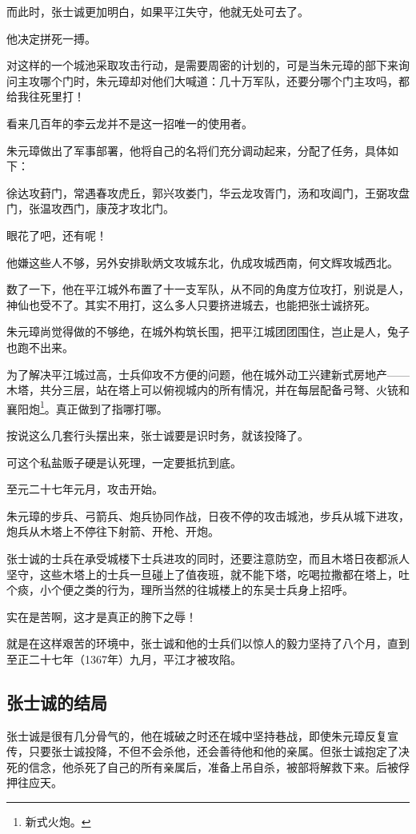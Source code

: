 \begin{multicols}{\theparacolNo}
		而此时，张士诚更加明白，如果平江失守，他就无处可去了。

		他决定拼死一搏。

		对这样的一个城池采取攻击行动，是需要周密的计划的，可是当朱元璋的部下来询问主攻哪个门时，朱元璋却对他们大喊道：几十万军队，还要分哪个门主攻吗，都给我往死里打！

		看来几百年的李云龙并不是这一招唯一的使用者。

		朱元璋做出了军事部署，他将自己的名将们充分调动起来，分配了任务，具体如下：

		徐达攻葑门，常遇春攻虎丘，郭兴攻娄门，华云龙攻胥门，汤和攻阊门，王弼攻盘门，张温攻西门，康茂才攻北门。

		眼花了吧，还有呢！

		他嫌这些人不够，另外安排耿炳文攻城东北，仇成攻城西南，何文辉攻城西北。

		数了一下，他在平江城外布置了十一支军队，从不同的角度方位攻打，别说是人，神仙也受不了。其实不用打，这么多人只要挤进城去，也能把张士诚挤死。

		朱元璋尚觉得做的不够绝，在城外构筑长围，把平江城团团围住，岂止是人，兔子也跑不出来。

		为了解决平江城过高，士兵仰攻不方便的问题，他在城外动工兴建新式房地产——木塔，共分三层，站在塔上可以俯视城内的所有情况，并在每层配备弓弩、火铳和襄阳炮\footnote{新式火炮。}。真正做到了指哪打哪。

		按说这么几套行头摆出来，张士诚要是识时务，就该投降了。

		可这个私盐贩子硬是认死理，一定要抵抗到底。

		至元二十七年元月，攻击开始。

		朱元璋的步兵、弓箭兵、炮兵协同作战，日夜不停的攻击城池，步兵从城下进攻，炮兵从木塔上不停往下射箭、开枪、开炮。

		张士诚的士兵在承受城楼下士兵进攻的同时，还要注意防空，而且木塔日夜都派人坚守，这些木塔上的士兵一旦碰上了值夜班，就不能下塔，吃喝拉撒都在塔上，吐个痰，小个便之类的行为，理所当然的往城楼上的东吴士兵身上招呼。

		实在是苦啊，这才是真正的胯下之辱！

		就是在这样艰苦的环境中，张士诚和他的士兵们以惊人的毅力坚持了八个月，直到至正二十七年（1367年）九月，平江才被攻陷。

		\subsection{张士诚的结局}
		张士诚是很有几分骨气的，他在城破之时还在城中坚持巷战，即使朱元璋反复宣传，只要张士诚投降，不但不会杀他，还会善待他和他的亲属。但张士诚抱定了决死的信念，他杀死了自己的所有亲属后，准备上吊自杀，被部将解救下来。后被俘押往应天。


\end{multicols}
